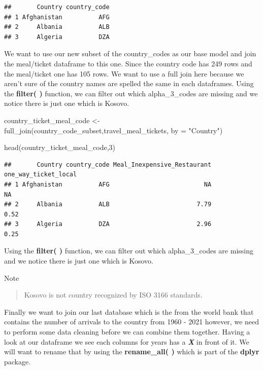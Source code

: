 \documentclass[
]{book}
\newenvironment{Shaded}{\begin{snugshade}}{\end{snugshade}}
\newcommand{\AttributeTok}[1]{\textcolor[rgb]{0.77,0.63,0.00}{#1}}
\newcommand{\DecValTok}[1]{\textcolor[rgb]{0.00,0.00,0.81}{#1}}
\newcommand{\FunctionTok}[1]{\textcolor[rgb]{0.00,0.00,0.00}{#1}}
\newcommand{\NormalTok}[1]{#1}
\newcommand{\OtherTok}[1]{\textcolor[rgb]{0.56,0.35,0.01}{#1}}
\newcommand{\StringTok}[1]{\textcolor[rgb]{0.31,0.60,0.02}{#1}}
\begin{document}
\begin{verbatim}
##       Country country_code
## 1 Afghanistan          AFG
## 2     Albania          ALB
## 3     Algeria          DZA
\end{verbatim}

We want to use our new subset of the country\_codes as our base model and join the meal/ticket dataframe to this one. Since the country code has 249 rows and the meal/ticket one has 105 rows. We want to use a full join here because we aren't sure of the country names are spelled the same in each dataframes. Using the \textbf{filter( )} function, we can filter out which alpha\_3\_codes are missing and we notice there is just one which is Kosovo.

\begin{Shaded}
\begin{Highlighting}[]
\NormalTok{country\_ticket\_meal\_code }\OtherTok{\textless{}{-}} \FunctionTok{full\_join}\NormalTok{(country\_code\_subset,travel\_meal\_tickets, }\AttributeTok{by =} \StringTok{"Country"}\NormalTok{)}

\FunctionTok{head}\NormalTok{(country\_ticket\_meal\_code,}\DecValTok{3}\NormalTok{)}
\end{Highlighting}
\end{Shaded}

\begin{verbatim}
##       Country country_code Meal_Inexpensive_Restaurant one_way_ticket_local
## 1 Afghanistan          AFG                          NA                   NA
## 2     Albania          ALB                        7.79                 0.52
## 3     Algeria          DZA                        2.96                 0.25
\end{verbatim}

Using the \textbf{filter( )} function, we can filter out which alpha\_3\_codes are missing and we notice there is just one which is Kosovo.

Note

\begin{quote}
Kosovo is not country recognized by ISO 3166 standards.
\end{quote}

Finally we want to join our last database which is the from the world bank that contains the number of arrivals to the country from 1960 - 2021 however, we need to perform some data cleaning before we can combine them together. Having a look at our dataframe we see each columns for years has a \textbf{\emph{X}} in front of it. We will want to rename that by using the \textbf{rename\_all( )} which is part of the \textbf{dplyr} package.
\end{document}
